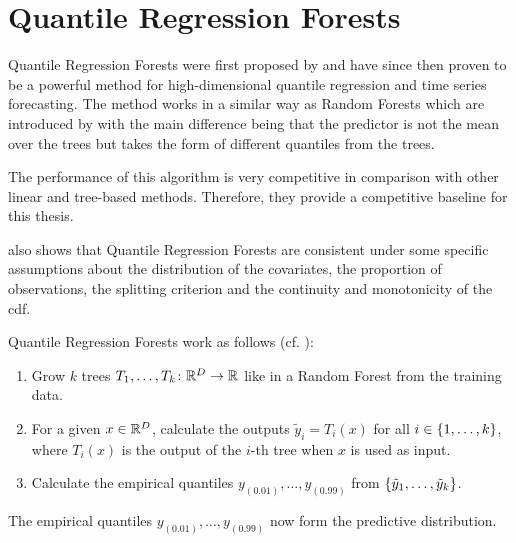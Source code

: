 \section{Quantile Regression Forests}
\label{sec:qrf}

Quantile Regression Forests were first proposed by \Textcite{Meinshausen2006}
and have since then proven to be a powerful method for high-dimensional quantile 
regression and time series forecasting. 
The method works in a similar way as Random Forests which are introduced by \Textcite{Breiman2001}
with the main difference 
being that the predictor is not the mean over the trees but takes the form of different quantiles 
from the trees.

The performance of this algorithm is very competitive in comparison with other 
linear and tree-based methods.
Therefore, they provide a competitive baseline for this thesis. 

\Textcite{Meinshausen2006} also shows that Quantile Regression Forests are consistent 
under some specific assumptions about the distribution of the covariates, the proportion of observations, the splitting criterion and the 
continuity and monotonicity of the \gls{cdf}.

Quantile Regression Forests work as follows (cf. \Textcite{Meinshausen2006}):
\begin{enumerate}
    \item Grow \(k\) trees \(T_1, \ldots, T_k\colon \mathbb{R}^D \rightarrow \mathbb{R}\) like in a Random Forest from the training data.
    \item For a given \(x\in\mathbb{R}^D\), calculate the outputs \( \tilde{y}_i = T_i(x) \) for all \(i \in \{1, \ldots, k\}\), 
    where \(T_i(x)\) is the output of the \(i\)-th tree when \(x\) is used as input.
    \item Calculate the empirical quantiles \(y_{(0.01)}, \ldots, y_{(0.99)}\) from 
    \(\{\tilde{y}_1, \ldots, \tilde{y}_k\}\).
\end{enumerate}

The empirical quantiles \(y_{(0.01)}, \ldots, y_{(0.99)}\) now form the predictive distribution.